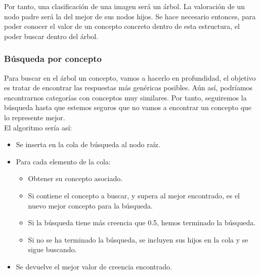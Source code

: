 Por tanto, una clasificación de una imagen será un árbol. La valoración de un nodo padre será la del mejor de sus nodos hijos. Se hace necesario entonces, para poder conocer el valor de un concepto concreto dentro de esta estructura, el poder buscar dentro del árbol.

\subsubsection{Búsqueda por concepto}

Para buscar en el árbol un concepto, vamos a hacerlo en profundidad, el objetivo es tratar de encontrar las respuestas más genéricas posibles. Aún así, podríamos encontrarnos categorías con conceptos muy similares. Por tanto, seguiremos la búsqueda hasta que estemos seguros que no vamos a encontrar un concepto que lo represente mejor.\\

El algoritmo sería así:
\begin{itemize}
\item Se inserta en la cola de búsqueda al nodo raíz.
\item Para cada elemento de la cola:
\begin{itemize}
\item Obtener su concepto asociado.
\item Si contiene el concepto a buscar, y supera al mejor encontrado, es el nuevo mejor concepto para la búsqueda.
\item Si la búsqueda tiene más creencia que 0.5, hemos terminado la búsqueda.
\item Si no se ha terminado la búsqueda, se incluyen sus hijos en la cola y se sigue buscando.
\end{itemize}
\item Se devuelve el mejor valor de creencia encontrado.
\end{itemize}